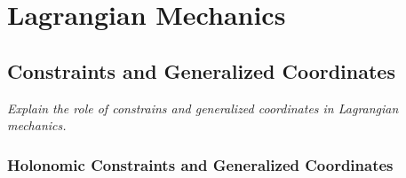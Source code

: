 \documentclass[11pt, a4paper]{article}
\begin{document}
\newpage
\section{Lagrangian Mechanics}

\subsection{Constraints and Generalized Coordinates}
\textit{Explain the role of constrains and generalized coordinates in Lagrangian mechanics.}

\subsubsection{Holonomic Constraints and Generalized Coordinates} \label{sssec:lag:hol_const}
\end{document}
